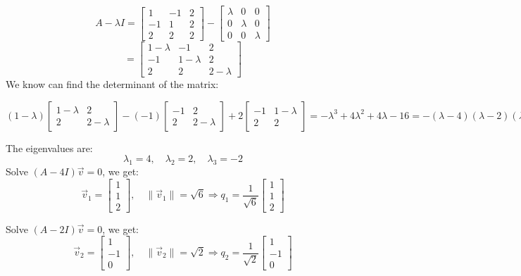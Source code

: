 \documentclass[12pt]{article}
\begin{document}
\begin{enumerate}[leftmargin=0em]
    \[ A - \lambda I = \begin{bmatrix}
    1 & -1 & 2 \\
    -1 & 1 & 2 \\
    2 & 2 & 2
    \end{bmatrix}
    -
    \begin{bmatrix}
        \lambda & 0 & 0 \\
        0 & \lambda & 0 \\
        0 & 0 & \lambda
    \end{bmatrix}
    \]
    \[
    = \begin{bmatrix}
        1 - \lambda & -1 & 2 \\
        -1 & 1-\lambda & 2 \\
        2 & 2 & 2-\lambda
    \end{bmatrix}
    \]
    We know can find the determinant of the matrix:
    
    \[(1-\lambda)
    \begin{bmatrix}
    1-\lambda & 2 \\
    2 & 2-\lambda
    \end{bmatrix}
    -(-1)
    \begin{bmatrix}
        -1 & 2 \\
        2 & 2-\lambda
    \end{bmatrix}
    +2 \begin{bmatrix}
        -1 & 1-\lambda \\
        2 & 2
    \end{bmatrix} 
    = 
    -\lambda^{3} + 4\lambda^{2}+4\lambda-16 = -(\lambda - 4)(\lambda - 2)(\lambda + 2)
    \]
    
    The eigenvalues are:
    \[
    \lambda_1 = 4, \quad \lambda_2 = 2, \quad \lambda_3 = -2
    \]
    Solve \( (A - 4I)\vec{v} = 0 \), we get:
    \[
    \vec{v}_1 = \begin{bmatrix} 1 \\ 1 \\ 2 \end{bmatrix}, \quad
    \|\vec{v}_1\| = \sqrt{6}
    \Rightarrow
    q_1 = \frac{1}{\sqrt{6}} \begin{bmatrix} 1 \\ 1 \\ 2 \end{bmatrix}
    \]
    
    Solve \( (A - 2I)\vec{v} = 0 \), we get:
    \[
    \vec{v}_2 = \begin{bmatrix} 1 \\ -1 \\ 0 \end{bmatrix}, \quad
    \|\vec{v}_2\| = \sqrt{2}
    \Rightarrow
    q_2 = \frac{1}{\sqrt{2}} \begin{bmatrix} 1 \\ -1 \\ 0 \end{bmatrix}
    \]
    

\end{enumerate}
\end{document}
